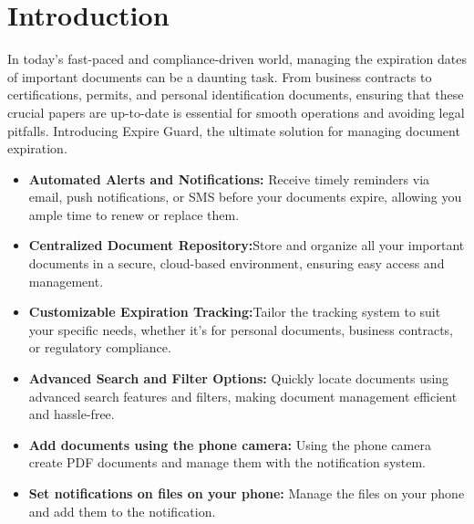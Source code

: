 \section{Introduction}
In today’s fast-paced and compliance-driven world, managing the expiration dates of important documents can be a daunting task. From business contracts to certifications, permits, and personal identification documents, ensuring that these crucial papers are up-to-date is essential for smooth operations and avoiding legal pitfalls. Introducing Expire Guard, the ultimate solution for managing document expiration.\\
\begin{itemize}
	\item \textbf{Automated Alerts and Notifications:} Receive timely reminders via email, push notifications, or SMS before your documents expire, allowing you ample time to renew or replace them.
	\item \textbf{Centralized Document Repository:}Store and organize all your important documents in a secure, cloud-based environment, ensuring easy access and management.
	\item \textbf{Customizable Expiration Tracking:}Tailor the tracking system to suit your specific needs, whether it’s for personal documents, business contracts, or regulatory compliance.
	\item \textbf{Advanced Search and Filter Options:} Quickly locate documents using advanced search features and filters, making document management efficient and hassle-free.
	\item \textbf{Add documents using the phone camera: } Using the phone camera create PDF documents and manage them with the notification system.
	\item \textbf{Set notifications on files on your phone: }Manage the files on your phone and add them to the notification.
\end{itemize}